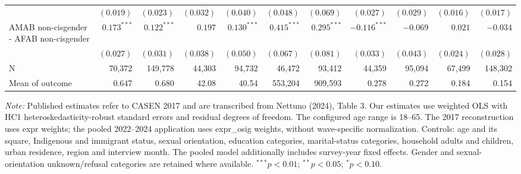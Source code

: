 \begin{table}[htbp]
{\begin{tabular}{l*{10}{r}}
 & $(0.019)$ & $(0.023)$ & $(0.032)$ & $(0.040)$ & $(0.048)$ & $(0.069)$ & $(0.027)$ & $(0.029)$ & $(0.016)$ & $(0.017)$ \\
AMAB non-cisgender - AFAB non-cisgender & $0.173^{***}$ & $0.122^{***}$ & $0.197$ & $0.130^{***}$ & $0.415^{***}$ & $0.295^{***}$ & $-0.116^{***}$ & $-0.069$ & $0.021$ & $-0.034$ \\
 & $(0.027)$ & $(0.031)$ & $(0.038)$ & $(0.050)$ & $(0.067)$ & $(0.081)$ & $(0.033)$ & $(0.043)$ & $(0.024)$ & $(0.028)$ \\
\midrule
N & 70,372 & 149,778 & 44,303 & 94,732 & 46,472 & 93,412 & 44,359 & 95,094 & 67,499 & 148,302 \\
Mean of outcome & 0.647 & 0.680 & 42.08 & 40.54 & 553,204 & 909,593 & 0.278 & 0.272 & 0.184 & 0.154 \\
\bottomrule
\end{tabular}%
}
\par\smallskip
\footnotesize\textit{Note:} Published estimates refer to CASEN 2017 and are transcribed from Nettuno (2024), Table 3. Our estimates use weighted OLS with HC1 heteroskedasticity-robust standard errors and residual degrees of freedom. The configured age range is 18--65. The 2017 reconstruction uses expr weights; the pooled 2022--2024 application uses expr\_osig weights, without wave-specific normalization. Controls: age and its square, Indigenous and immigrant status, sexual orientation, education categories, marital-status categories, household adults and children, urban residence, region and interview month. The pooled model additionally includes survey-year fixed effects. Gender and sexual-orientation unknown/refusal categories are retained where available. $^{***}p<0.01$; $^{**}p<0.05$; $^{*}p<0.10$.
\end{table}
